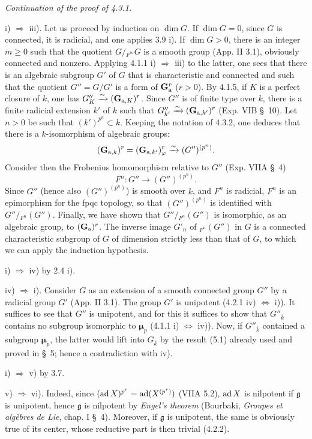 \noindent\emph{Continuation of the proof of 4.3.1.}

\noindent i) $\Rightarrow$ iii). Let us proceed by induction on $\dim G$. If $\dim G=0$, since $G$ is connected, it is radicial, and one applies 3.9 i). If $\dim G>0$, there is an integer $m\geq0$ such that the quotient $G/{}_{F^m}G$ is a smooth group (App. II 3.1), obviously connected and nonzero. Applying 4.1.1 i) $\Rightarrow$ iii) to the latter, one sees that there is an algebraic subgroup $G'$ of $G$ that is characteristic and connected and such that the quotient $G''=G/G'$ is a form of $\mathbf{G}_{\mathrm{a}}^r$ ($r>0$). By 4.1.5, if $K$ is a perfect closure of $k$, one has $G''_K\xrightarrow{\sim}(\mathbf G_{\mathrm a,K})^r$. Since $G''$ is of finite type over $k$, there is a finite radicial extension $k'$ of $k$ such that $G''_{k'}\xrightarrow{\sim}(\mathbf G_{\mathrm a,k'})^r$ (Exp. VIB \S~10). Let $n>0$ be such that $(k')^{p^n}\subset k$. Keeping the notation of 4.3.2, one deduces that there is a $k$-isomorphism of algebraic groups:
\[
 (\mathbf G_{\mathrm a,k})^r=(\mathbf G_{\mathrm a,k'})^r_\varphi
 \xrightarrow{\sim}(G'')^{(p^n)}.
\]
Consider then the Frobenius homomorphism relative to $G''$ (Exp. VIIA \S~4)
\[
 F^n:G''\to(G'')^{(p^n)}.
\]
Since $G''$ (hence also $(G'')^{(p^n)}$) is smooth over $k$, and $F^n$ is radicial, $F^n$ is an epimorphism for the fpqc topology, so that $(G'')^{(p^n)}$ is identified with $G''/{}_{F^n}(G'')$. Finally, we have shown that $G''/{}_{F^n}(G'')$ is isomorphic, as an algebraic group, to $(\mathbf{G}_{\mathrm{a}})^r$. The inverse image $G'_n$ of ${}_{F^n}(G'')$ in $G$ is a connected characteristic subgroup of $G$ of dimension strictly less than that of $G$, to which we can apply the induction hypothesis.

\noindent i) $\Rightarrow$ iv) by 2.4 i).

\noindent iv) $\Rightarrow$ i). Consider $G$ as an extension of a smooth connected group $G''$ by a radicial group $G'$ (App. II 3.1). The group $G'$ is unipotent (4.2.1 iv) $\Leftrightarrow$ i)). It suffices to see that $G''$ is unipotent, and for this it suffices to show that $G''_{\overline k}$ contains no subgroup isomorphic to $\boldsymbol\mu_p$ (4.1.1 i) $\Leftrightarrow$ iv)). Now, if $G''_{\overline k}$ contained a subgroup $\boldsymbol\mu_p$, the latter would lift into $G_{\overline k}$ by the result (5.1) already used and proved in \S~5; hence a contradiction with iv).

\noindent i) $\Rightarrow$ v) by 3.7.

\noindent v) $\Rightarrow$ vi). Indeed, since $(\operatorname{ad} X)^{p^r}=\operatorname{ad}(X^{(p^r)})$ (VIIA 5.2), $\operatorname{ad} X$ is nilpotent if $\mathfrak g$ is unipotent, hence $\mathfrak g$ is nilpotent by \emph{Engel's theorem} (Bourbaki, \emph{Groupes et algèbres de Lie}, chap. I \S~4). Moreover, if $\mathfrak g$ is unipotent, the same is obviously true of its center, whose reductive part is then trivial (4.2.2).

